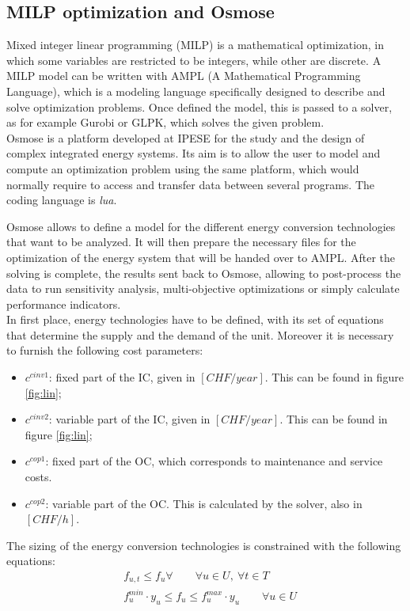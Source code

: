 \documentclass{article}
\begin{document}
\subsection{MILP optimization and Osmose}\label{ss:osmose}

Mixed integer linear programming (MILP) is a mathematical optimization, in which some variables are restricted to be integers, while other are discrete. A MILP model can be written with AMPL (A Mathematical Programming Language), which is a modeling language specifically designed to describe and solve optimization problems. Once defined the model, this is passed to a solver, as for example Gurobi or GLPK, which solves the given problem.\\

Osmose is a platform developed at IPESE for the study and the design of complex integrated energy systems. Its aim is to allow the user to model and compute an optimization problem using the same platform, which would normally require to access and transfer data between several programs. The coding language is \textit{lua}.

Osmose allows to define a model for the different energy conversion technologies that want to be analyzed. It will then prepare the necessary files for the optimization of the energy system that will be handed over to AMPL. After the solving is complete, the results sent back to Osmose, allowing to post-process the data to run sensitivity analysis, multi-objective optimizations or simply calculate performance indicators.\\

In first place, energy technologies have to be defined, with its set of equations that determine the supply and the demand of the unit. Moreover it is necessary to furnish the following cost parameters:
\begin{itemize}
	\item $c^{cinv1}$: fixed part of the IC, given in $[CHF/year]$. This can be found in figure \ref{fig:lin};
	\item $c^{cinv2}$: variable part of the IC, given in $[CHF/year]$. This can be found in figure \ref{fig:lin};
	\item $c^{cop1}$: fixed part of the OC, which corresponds to maintenance and service costs. 
	\item $c^{cop2}$: variable part of the OC. This is calculated by the solver, also in $[CHF/h]$.
\end{itemize}

The sizing of the energy conversion technologies is constrained with the following equations\cite{suciuEnergyIntegrationCO22018a}:
\begin{align}
& f_{u,t} \leq f_{u} \forall \qquad \forall u \in U, \ \forall t \in T  \\
& f_{u}^{min} \cdot y_{u} \leq f_{u} \leq f_{u}^{max} \cdot y_{u} \qquad \forall u \in U\\
\end{align}
\end{document}
